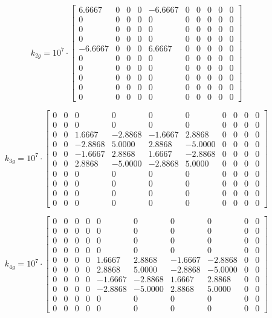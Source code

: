 \documentclass[8pt]{article}
\begin{document}
\[
k_{2g} = 10^7 \cdot 
\begin{bmatrix}
  6.6667 & 0 & 0 & 0 & -6.6667 & 0 & 0 & 0 & 0 & 0 \\
  0 & 0 & 0 & 0 & 0 & 0 & 0 & 0 & 0 & 0 \\
  0 & 0 & 0 & 0 & 0 & 0 & 0 & 0 & 0 & 0 \\
  0 & 0 & 0 & 0 & 0 & 0 & 0 & 0 & 0 & 0 \\
 -6.6667 & 0 & 0 & 0 & 6.6667 & 0 & 0 & 0 & 0 & 0 \\
  0 & 0 & 0 & 0 & 0 & 0 & 0 & 0 & 0 & 0 \\
  0 & 0 & 0 & 0 & 0 & 0 & 0 & 0 & 0 & 0 \\
  0 & 0 & 0 & 0 & 0 & 0 & 0 & 0 & 0 & 0 \\
  0 & 0 & 0 & 0 & 0 & 0 & 0 & 0 & 0 & 0 \\
  0 & 0 & 0 & 0 & 0 & 0 & 0 & 0 & 0 & 0
\end{bmatrix}
\]

\[
k_{3g} = 10^7 \cdot 
\begin{bmatrix}
  0 & 0 & 0 & 0 & 0 & 0 & 0 & 0 & 0 & 0 \\
  0 & 0 & 0 & 0 & 0 & 0 & 0 & 0 & 0 & 0 \\
  0 & 0 & 1.6667 & -2.8868 & -1.6667 & 2.8868 & 0 & 0 & 0 & 0 \\
  0 & 0 & -2.8868 & 5.0000 & 2.8868 & -5.0000 & 0 & 0 & 0 & 0 \\
  0 & 0 & -1.6667 & 2.8868 & 1.6667 & -2.8868 & 0 & 0 & 0 & 0 \\
  0 & 0 & 2.8868 & -5.0000 & -2.8868 & 5.0000 & 0 & 0 & 0 & 0 \\
  0 & 0 & 0 & 0 & 0 & 0 & 0 & 0 & 0 & 0 \\
  0 & 0 & 0 & 0 & 0 & 0 & 0 & 0 & 0 & 0 \\
  0 & 0 & 0 & 0 & 0 & 0 & 0 & 0 & 0 & 0 \\
  0 & 0 & 0 & 0 & 0 & 0 & 0 & 0 & 0 & 0
\end{bmatrix}
\]

\[
k_{4g} = 10^7 \cdot 
\begin{bmatrix}
  0 & 0 & 0 & 0 & 0 & 0 & 0 & 0 & 0 & 0 \\
  0 & 0 & 0 & 0 & 0 & 0 & 0 & 0 & 0 & 0 \\
  0 & 0 & 0 & 0 & 0 & 0 & 0 & 0 & 0 & 0 \\
  0 & 0 & 0 & 0 & 0 & 0 & 0 & 0 & 0 & 0 \\
  0 & 0 & 0 & 0 & 1.6667 & 2.8868 & -1.6667 & -2.8868 & 0 & 0 \\
  0 & 0 & 0 & 0 & 2.8868 & 5.0000 & -2.8868 & -5.0000 & 0 & 0 \\
  0 & 0 & 0 & 0 & -1.6667 & -2.8868 & 1.6667 & 2.8868 & 0 & 0 \\
  0 & 0 & 0 & 0 & -2.8868 & -5.0000 & 2.8868 & 5.0000 & 0 & 0 \\
  0 & 0 & 0 & 0 & 0 & 0 & 0 & 0 & 0 & 0 \\
  0 & 0 & 0 & 0 & 0 & 0 & 0 & 0 & 0 & 0
\end{bmatrix}
\]
\end{document}
